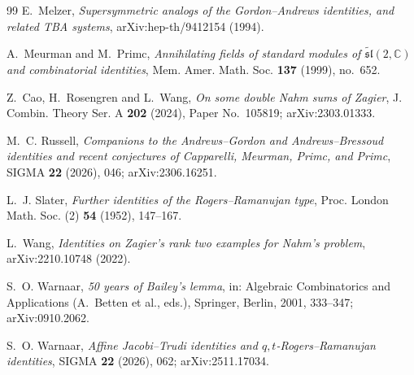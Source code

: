 \documentclass[11pt]{amsart}
\theoremstyle{definition}
\numberwithin{equation}{section}
\begin{document}
\begin{thebibliography}{99}
 E.~Melzer, \emph{Supersymmetric analogs of the Gordon--Andrews identities, and related
TBA systems}, arXiv:hep-th/9412154 (1994).

 A.~Meurman and M.~Primc, \emph{Annihilating fields of standard modules of
$\widetilde{\mathfrak{sl}}(2,\mathbb C)$ and combinatorial identities}, Mem. Amer. Math. Soc.
\textbf{137} (1999), no.~652.

 Z.~Cao, H.~Rosengren and L.~Wang, \emph{On some double Nahm sums of Zagier}, J. Combin.
Theory Ser. A \textbf{202} (2024), Paper No.~105819; arXiv:2303.01333.

 M.~C. Russell, \emph{Companions to the Andrews--Gordon and Andrews--Bressoud identities
and recent conjectures of Capparelli, Meurman, Primc, and Primc}, SIGMA \textbf{22} (2026), 046;
arXiv:2306.16251.

 L.~J. Slater, \emph{Further identities of the Rogers--Ramanujan type}, Proc. London Math.
Soc. (2) \textbf{54} (1952), 147--167.

 L.~Wang, \emph{Identities on Zagier's rank two examples for Nahm's problem},
arXiv:2210.10748 (2022).

 S.~O. Warnaar, \emph{50 years of Bailey's lemma}, in: Algebraic Combinatorics and
Applications (A.~Betten et al., eds.), Springer, Berlin, 2001, 333--347; arXiv:0910.2062.

 S.~O. Warnaar, \emph{Affine Jacobi--Trudi identities and $q,t$-Rogers--Ramanujan
identities}, SIGMA \textbf{22} (2026), 062; arXiv:2511.17034.

\end{thebibliography}
\end{document}
